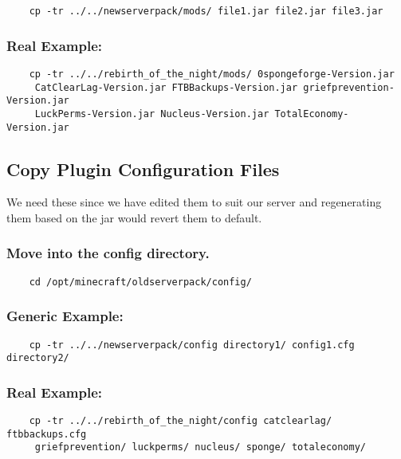 \documentclass{report}
\begin{document}
\begin{verbatim}
	cp -tr ../../newserverpack/mods/ file1.jar file2.jar file3.jar 
\end{verbatim}

\subsubsection*{Real Example:}

\begin{verbatim}
	cp -tr ../../rebirth_of_the_night/mods/ 0spongeforge-Version.jar
	 CatClearLag-Version.jar FTBBackups-Version.jar griefprevention-Version.jar
	 LuckPerms-Version.jar Nucleus-Version.jar TotalEconomy-Version.jar
\end{verbatim}

\subsection{Copy Plugin Configuration Files}
We need these since we have edited them to suit our server and regenerating them based on the jar would revert them to default.

\subsubsection*{Move into the config directory.}

\begin{verbatim}
	cd /opt/minecraft/oldserverpack/config/
\end{verbatim}

\subsubsection*{Generic Example:}

\begin{verbatim}
	cp -tr ../../newserverpack/config directory1/ config1.cfg directory2/
\end{verbatim}

\subsubsection*{Real Example:}

\begin{verbatim}
	cp -tr ../../rebirth_of_the_night/config catclearlag/ ftbbackups.cfg
	 griefprevention/ luckperms/ nucleus/ sponge/ totaleconomy/
\end{verbatim}
\end{document}
